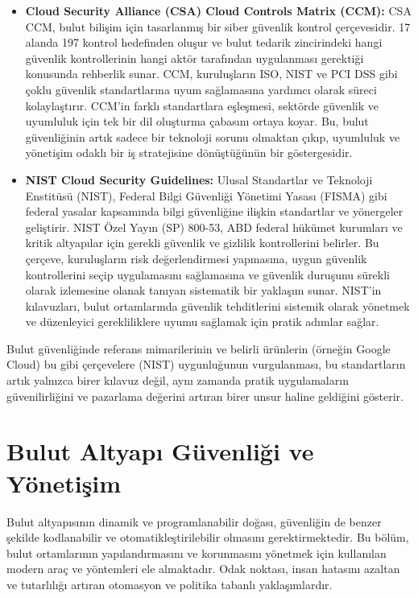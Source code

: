 \begin{itemize}
    \item \textbf{Cloud Security Alliance (CSA) Cloud Controls Matrix (CCM):} CSA CCM, bulut bilişim için tasarlanmış bir siber güvenlik kontrol çerçevesidir. 17 alanda 197 kontrol hedefinden oluşur ve bulut tedarik zincirindeki hangi güvenlik kontrollerinin hangi aktör tarafından uygulanması gerektiği konusunda rehberlik sunar. CCM, kuruluşların ISO, NIST ve PCI DSS gibi çoklu güvenlik standartlarına uyum sağlamasına yardımcı olarak süreci kolaylaştırır. CCM'in farklı standartlara eşleşmesi, sektörde güvenlik ve uyumluluk için tek bir dil oluşturma çabasını ortaya koyar. Bu, bulut güvenliğinin artık sadece bir teknoloji sorunu olmaktan çıkıp, uyumluluk ve yönetişim odaklı bir iş stratejisine dönüştüğünün bir göstergesidir.
    \item \textbf{NIST Cloud Security Guidelines:} Ulusal Standartlar ve Teknoloji Enstitüsü (NIST), Federal Bilgi Güvenliği Yönetimi Yasası (FISMA) gibi federal yasalar kapsamında bilgi güvenliğine ilişkin standartlar ve yönergeler geliştirir. NIST Özel Yayın (SP) 800-53, ABD federal hükümet kurumları ve kritik altyapılar için gerekli güvenlik ve gizlilik kontrollerini belirler. Bu çerçeve, kuruluşların risk değerlendirmesi yapmasına, uygun güvenlik kontrollerini seçip uygulamasını sağlamasına ve güvenlik duruşunu sürekli olarak izlemesine olanak tanıyan sistematik bir yaklaşım sunar. NIST'in kılavuzları, bulut ortamlarında güvenlik tehditlerini sistemik olarak yönetmek ve düzenleyici gerekliliklere uyumu sağlamak için pratik adımlar sağlar.
\end{itemize}

Bulut güvenliğinde referans mimarilerinin ve belirli ürünlerin (örneğin Google Cloud) bu gibi çerçevelere (NIST) uygunluğunun vurgulanması, bu standartların artık yalnızca birer kılavuz değil, aynı zamanda pratik uygulamaların güvenilirliğini ve pazarlama değerini artıran birer unsur haline geldiğini gösterir.

\section{Bulut Altyapı Güvenliği ve Yönetişim}

Bulut altyapısının dinamik ve programlanabilir doğası, güvenliğin de benzer şekilde kodlanabilir ve otomatikleştirilebilir olmasını gerektirmektedir. Bu bölüm, bulut ortamlarının yapılandırmasını ve korunmasını yönetmek için kullanılan modern araç ve yöntemleri ele almaktadır. Odak noktası, insan hatasını azaltan ve tutarlılığı artıran otomasyon ve politika tabanlı yaklaşımlardır.

